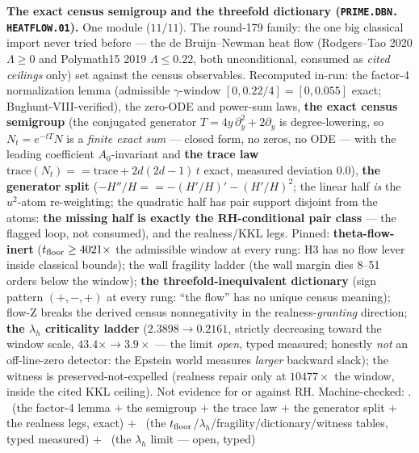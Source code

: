 \documentclass[11pt,a4paper]{article}
\theoremstyle{definition}
\begin{document}
\par\smallskip\noindent\textbf{The exact census semigroup and the
threefold dictionary (\texttt{PRIME.\allowbreak DBN.\allowbreak
HEATFLOW.01}).}
One module ($11/11$).  The round-179 family: the one big classical
import never tried before --- the de Bruijn--Newman heat flow
(Rodgers--Tao 2020 $\Lambda \ge 0$ and Polymath15 2019 $\Lambda
\le 0.22$, both unconditional, consumed as \emph{cited ceilings}
only) set against the census observables.  Recomputed in-run: the
factor-4 normalization lemma (admissible $\gamma$-window
$[0, 0.22/4] = [0, 0.055]$ exact; Bughunt-VIII-verified), the
zero-ODE and power-sum laws, \textbf{the exact census semigroup}
(the conjugated generator $T = 4y\,\partial_y^2 + 2\partial_y$ is
degree-lowering, so $N_t = e^{-tT}N$ is a \emph{finite exact sum}
--- closed form, no zeros, no ODE --- with the leading coefficient
$A_0$-invariant and \textbf{the trace law} $\mathrm{trace}(N_t) ==
\mathrm{trace} + 2d(2d-1)\,t$ exact, measured deviation $0.0$),
\textbf{the generator split} ($-H''/H == -(H'/H)' - (H'/H)^2$; the
linear half \emph{is} the $u^2$-atom re-weighting; the quadratic
half has pair support disjoint from the atoms: \textbf{the missing
half is exactly the RH-conditional pair class} --- the flagged
loop, not consumed), and the realness/KKL legs.  Pinned:
\textbf{theta-flow-inert} ($t_{\rm floor} \ge 4021\times$ the
admissible window at every rung: H3 has no flow lever inside
classical bounds); the wall fragility ladder (the wall margin dies
8--51 orders below the window); \textbf{the threefold-inequivalent
dictionary} (sign pattern $(+,-,+)$ at every rung: ``the flow''
has no unique census meaning); flow-Z breaks the derived census
nonnegativity in the realness-\emph{granting} direction;
\textbf{the $\lambda_h$ criticality ladder} ($2.3898 \to 0.2161$,
strictly decreasing toward the window scale, $43.4\times \to
3.9\times$ --- the limit \emph{open}, typed measured; honestly
\emph{not} an off-line-zero detector: the Epstein world measures
\emph{larger} backward slack); the witness is
preserved-not-expelled (realness repair only at $10477\times$ the
window, inside the cited KKL ceiling).  Not evidence for or
against RH.
Machine-checked: .
\mE\ (the factor-4 lemma $+$ the semigroup $+$ the trace law $+$
the generator split $+$ the realness legs, exact) $+$ \mC\ (the
$t_{\rm floor}$/$\lambda_h$/fragility/dictionary/witness tables,
typed measured) $+$ \mO\ (the $\lambda_h$ limit --- open, typed)
\par\smallskip
\end{document}
